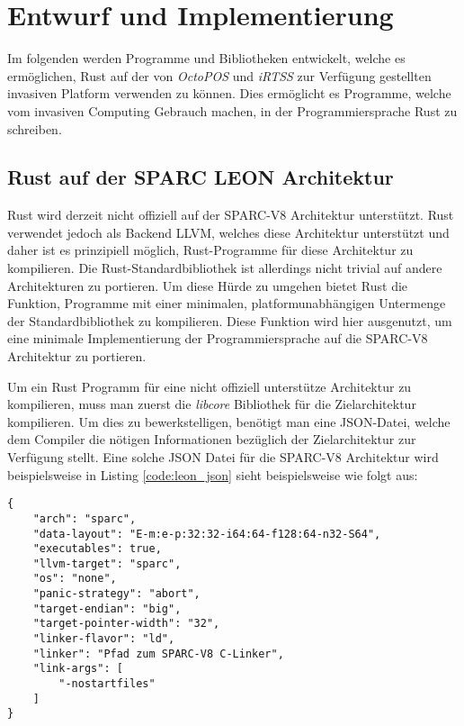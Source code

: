 \chapter{Entwurf und Implementierung}\label{sec:impl}

Im folgenden werden Programme und Bibliotheken entwickelt, welche es ermöglichen, Rust auf der von
\textit{OctoPOS} und \textit{iRTSS} zur Verfügung gestellten invasiven Platform verwenden zu können.
Dies ermöglicht es Programme, welche vom invasiven Computing Gebrauch machen, in der
Programmiersprache Rust zu schreiben.

\section{Rust auf der SPARC LEON Architektur}\label{sec:rust_on_sparc}

Rust wird derzeit nicht offiziell auf der SPARC-V8 Architektur unterstützt. Rust verwendet jedoch als Backend LLVM,
welches diese Architektur unterstützt und daher ist es prinzipiell möglich,
Rust-Programme für diese Architektur zu kompilieren.
Die Rust-Standardbibliothek ist allerdings nicht trivial auf andere Architekturen zu portieren.
Um diese Hürde zu umgehen bietet Rust die Funktion,
Programme mit einer minimalen, platformunabhängigen Untermenge der Standardbibliothek zu kompilieren.
Diese Funktion wird hier ausgenutzt,
um eine minimale Implementierung der Programmiersprache auf die SPARC-V8 Architektur zu portieren.

Um ein Rust Programm für eine nicht offiziell unterstütze Architektur zu kompilieren,
muss man zuerst die \textit{libcore} Bibliothek
für die Zielarchitektur kompilieren. Um dies zu bewerkstelligen, benötigt man eine JSON-Datei, welche
dem Compiler die nötigen Informationen bezüglich der Zielarchitektur zur Verfügung stellt.
Eine solche JSON Datei für die
SPARC-V8 Architektur wird beispielsweise in Listing \ref{code:leon_json}  sieht beispielsweise wie folgt aus\cite{initialSparcSupportGithub}:

\begin{lstlisting}[float,caption={
Eine beispielhafte JSON-Spezifikationsdatei für die SPARC-V8 Architektur.
\cite{initialSparcSupportGithub}
},label=code:leon_json]
{
    "arch": "sparc",
    "data-layout": "E-m:e-p:32:32-i64:64-f128:64-n32-S64",
    "executables": true,
    "llvm-target": "sparc",
    "os": "none",
    "panic-strategy": "abort",
    "target-endian": "big",
    "target-pointer-width": "32",
    "linker-flavor": "ld",
    "linker": "Pfad zum SPARC-V8 C-Linker",
    "link-args": [
        "-nostartfiles"
    ]
}
\end{lstlisting}

